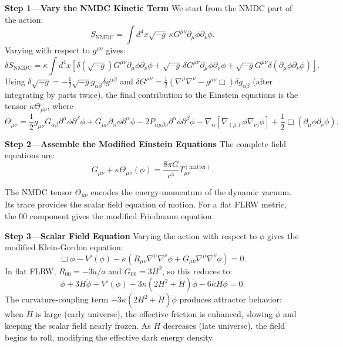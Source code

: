 \documentclass[12pt,a4paper]{book}
\theoremstyle{definition}
\theoremstyle{remark}
\begin{document}
\textbf{Step 1---Vary the NMDC Kinetic Term} We start from the NMDC part of the action:
\begin{equation}
    S_{\mathrm{NMDC}} = \int d^4x \sqrt{-g} \, \kappa G^{\mu\nu} \partial_\mu\phi \partial_\nu\phi.
\end{equation}
Varying with respect to $g^{\mu\nu}$ gives:
\begin{equation}
    \delta S_{\mathrm{NMDC}} = \kappa \int d^4x \left[ \delta(\sqrt{-g}) G^{\mu\nu} \partial_\mu\phi \partial_\nu\phi + \sqrt{-g} \, \delta G^{\mu\nu} \partial_\mu\phi \partial_\nu\phi + \sqrt{-g} G^{\mu\nu} \delta(\partial_\mu\phi \partial_\nu\phi) \right].
\end{equation}
Using $\delta\sqrt{-g} = -\frac{1}{2}\sqrt{-g} g_{\alpha\beta} \delta g^{\alpha\beta}$ and $\delta G^{\mu\nu} = \frac{1}{2}(\nabla^\mu\nabla^\nu - g^{\mu\nu}\Box)\delta g_{\alpha\beta}$ (after integrating by parts twice), the final contribution to the Einstein equations is the tensor $\kappa \Theta_{\mu\nu}$, where
\begin{equation}
    \Theta_{\mu\nu} = \frac{1}{2}g_{\mu\nu} G_{\alpha\beta} \partial^\alpha\phi \partial^\beta\phi + G_{\mu\nu} \partial_\alpha\phi \partial^\alpha\phi - 2P_{\alpha\mu\beta\nu} \partial^\alpha\phi \partial^\beta\phi - \nabla_\alpha\left[\nabla_{(\mu)}\phi \nabla_{\nu)}\phi\right] + \frac{1}{2}\Box\left(\partial_\mu\phi \partial_\nu\phi\right).
\end{equation}

\textbf{Step 2---Assemble the Modified Einstein Equations} The complete field equations are:
\begin{equation}
    G_{\mu\nu} + \kappa \Theta_{\mu\nu}(\phi) = \frac{8\pi G}{c^4} T_{\mu\nu}^{(\mathrm{matter})}.
\end{equation}

The NMDC tensor $\Theta_{\mu\nu}$ encodes the energy-momentum of the dynamic vacuum. Its trace provides the scalar field equation of motion. For a flat FLRW metric, the 00 component gives the modified Friedmann equation.

\textbf{Step 3---Scalar Field Equation} Varying the action with respect to $\phi$ gives the modified Klein-Gordon equation:
\begin{equation}
    \Box\phi - V'(\phi) - \kappa\left(R_{\mu\nu}\nabla^\mu\nabla^\nu\phi + G_{\mu\nu}\nabla^\mu\nabla^\nu\phi\right) = 0.
\end{equation}
In flat FLRW, $R_{00} = -3\ddot{a}/a$ and $G_{00} = 3H^2$, so this reduces to:
\begin{equation}
    \ddot{\phi} + 3H\dot{\phi} + V'(\phi) - 3\kappa\left(2H^2 + \dot{H}\right)\dot{\phi} - 6\kappa H\ddot{\phi} = 0.
\end{equation}
The curvature-coupling term $-3\kappa(2H^2 + \dot{H})\dot{\phi}$ produces attractor behavior: when $H$ is large (early universe), the effective friction is enhanced, slowing $\dot{\phi}$ and keeping the scalar field nearly frozen. As $H$ decreases (late universe), the field begins to roll, modifying the effective dark energy density.
\end{document}
